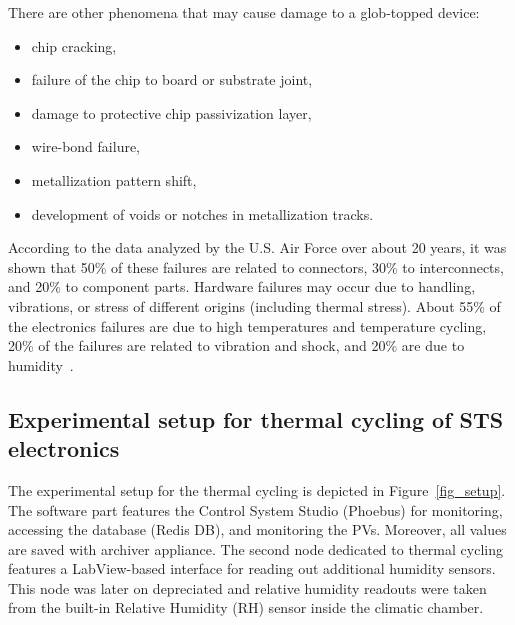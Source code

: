 \newpage


There are other phenomena that may cause damage to a glob-topped device:
\begin{itemize}
    \item chip cracking,
    \item failure of the chip to board or substrate joint,
    \item damage to protective chip passivization layer,
    \item wire-bond failure,
    \item metallization pattern shift,
    \item development of voids or notches in metallization tracks. 
\end{itemize}


According to the data analyzed by the U.S. Air Force over about 20 years, it was shown that 50\% of these failures are related to connectors, 30\% to interconnects, and 20\% to component
parts. Hardware failures may occur due to handling, vibrations, or stress of different origins (including thermal stress). About 55\% of the electronics failures are due to high temperatures and temperature cycling, 20\% of the failures are related to vibration and shock, and 20\% are due to humidity~\cite{thermal_electronics}. 




\subsection{Experimental setup for thermal cycling of STS electronics}
\label{cycling_setup}
The experimental setup for the thermal cycling is depicted in Figure~\ref{fig_setup}. The software part features the Control System Studio (Phoebus) for monitoring, accessing the database (Redis DB), and monitoring the \gls{PV}s. Moreover, all values are saved with archiver appliance. The second node dedicated to thermal cycling features a LabView-based interface for reading out additional humidity sensors. This node was later on depreciated and relative humidity readouts were taken from the built-in Relative Humidity (\gls{RH}) sensor inside the climatic chamber.

